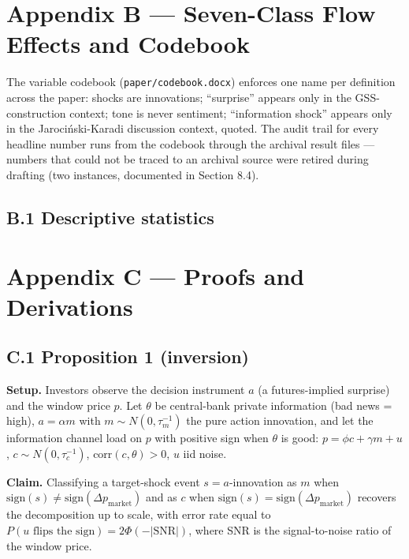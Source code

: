 \section{Appendix B --- Seven-Class Flow Effects and Codebook}\label{appendix-b-seven-class-flow-effects-and-codebook}



The variable codebook (\texttt{paper/codebook.docx}) enforces one name per definition across the paper: shocks are innovations; ``surprise'' appears only in the GSS-construction context; tone is never sentiment; ``information shock'' appears only in the Jarociński-Karadi discussion context, quoted. The audit trail for every headline number runs from the codebook through the archival result files --- numbers that could not be traced to an archival source were retired during drafting (two instances, documented in Section 8.4).

\subsection{B.1 Descriptive statistics}\label{b.1-descriptive-statistics}



\section{Appendix C --- Proofs and Derivations}\label{appendix-c-proofs-and-derivations}

\subsection{C.1 Proposition 1 (inversion)}\label{c.1-proposition-1-inversion}

\textbf{Setup.} Investors observe the decision instrument \(a\) (a futures-implied surprise) and the window price \(p\). Let \(\theta\) be central-bank private information (bad news = high), \(a = \alpha m\) with \(m \sim N(0, \tau_m^{-1})\) the pure action innovation, and let the information channel load on \(p\) with positive sign when \(\theta\) is good: \(p = \phi c + \gamma m + u\), \(c \sim N(0, \tau_c^{-1})\), \(\text{corr}(c, \theta) > 0\), \(u\) iid noise.

\textbf{Claim.} Classifying a target-shock event \(s = a\)-innovation as \(m\) when \(\text{sign}(s) \neq \text{sign}(\Delta p_{\text{market}})\) and as \(c\) when \(\text{sign}(s) = \text{sign}(\Delta p_{\text{market}})\) recovers the decomposition up to scale, with error rate equal to \(P(u \text{ flips the sign}) = 2\Phi(-|\text{SNR}|)\), where SNR is the signal-to-noise ratio of the window price.

